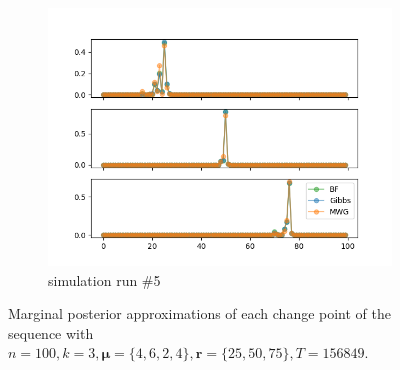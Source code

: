 \begin{figure}[H]
\begin{subfigure}{.3\textwidth}
    	\includegraphics[width=\linewidth]{../../plots/Posterior_post_burnin_M4_N100_NMCMC3_seed4_diffind2.png}
    	\caption{simulation run \#5}
	\end{subfigure}
	\caption{Marginal posterior approximations of each change point of the sequence with $n=100, k=3, \bm{\mu}=\{4,6,2,4\}, \bm{r}=\{25,50,75\}, T=156849$.}
\end{figure}

